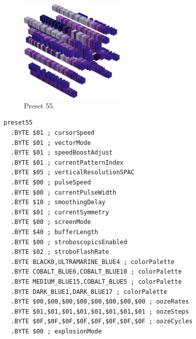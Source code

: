 \begin{minipage}[b]{0.48\linewidth}
\begin{figure}[H]                                                          
  \centering                                                             
  \begin{adjustbox}{width=5cm,center}                                   
  \includegraphics[width=5cm]{src/colorspace_presets/preset55-45.png}%
  \end{adjustbox}                                                        
\caption*{Preset 55.}                                           
\end{figure}                                                               
\end{minipage}
\hspace{0.1cm}
\begin{minipage}[b]{0.48\linewidth}                                       
\begin{lstlisting}[basicstyle=\ttfamily\tiny]
preset55
  .BYTE $01 ; cursorSpeed
  .BYTE $01 ; vectorMode
  .BYTE $01 ; speedBoostAdjust
  .BYTE $01 ; currentPatternIndex
  .BYTE $05 ; verticalResolutionSPAC
  .BYTE $00 ; pulseSpeed
  .BYTE $00 ; currentPulseWidth
  .BYTE $10 ; smoothingDelay
  .BYTE $01 ; currentSymmetry
  .BYTE $00 ; screenMode
  .BYTE $40 ; bufferLength
  .BYTE $00 ; stroboscopicsEnabled
  .BYTE $02 ; stroboFlashRate
  .BYTE BLACK0,ULTRAMARINE_BLUE4 ; colorPalette
  .BYTE COBALT_BLUE6,COBALT_BLUE10 ; colorPalette
  .BYTE MEDIUM_BLUE15,COBALT_BLUE5 ; colorPalette
  .BYTE DARK_BLUE1,DARK_BLUE17 ; colorPalette
  .BYTE $00,$00,$00,$00,$00,$00,$00,$00 ; oozeRates
  .BYTE $01,$01,$01,$01,$01,$01,$01,$01 ; oozeSteps
  .BYTE $0F,$0F,$0F,$0F,$0F,$0F,$0F,$0F ; oozeCycles
  .BYTE $00 ; explosionMode
\end{lstlisting}
\end{minipage}

